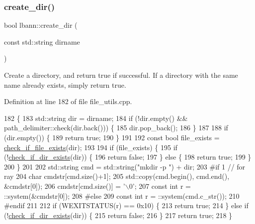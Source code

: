 \subsubsection{\texorpdfstring{create\+\_\+dir()}{create\_dir()}}
{\footnotesize\ttfamily bool lbann\+::create\+\_\+dir (\begin{DoxyParamCaption}\item[{const std\+::string}]{dirname }\end{DoxyParamCaption})}

Create a directory, and return true if successful. If a directory with the same name already exists, simply return true. 

Definition at line 182 of file file\+\_\+utils.\+cpp.


\begin{DoxyCode}
182                                          \{
183   std::string dir = dirname;
184   \textcolor{keywordflow}{if} (!dir.empty() && path\_delimiter::check(dir.back())) \{
185     dir.pop\_back();
186   \}
187 
188   \textcolor{keywordflow}{if} (dir.empty()) \{
189     \textcolor{keywordflow}{return} \textcolor{keyword}{true};
190   \}
191 
192   \textcolor{keyword}{const} \textcolor{keywordtype}{bool} file\_exists = \hyperlink{namespacelbann_a4fac6c6483965395fa79d31061485f9f}{check\_if\_file\_exists}(dir);
193 
194   \textcolor{keywordflow}{if} (file\_exists) \{
195     \textcolor{keywordflow}{if} (!\hyperlink{namespacelbann_a3ee4a1fa7a82c30999de9eb626c68311}{check\_if\_dir\_exists}(dir)) \{
196       \textcolor{keywordflow}{return} \textcolor{keyword}{false};
197     \} \textcolor{keywordflow}{else} \{
198       \textcolor{keywordflow}{return} \textcolor{keyword}{true};
199     \}
200   \}
201 
202   std::string cmd = std::string(\textcolor{stringliteral}{"mkdir -p "}) + dir;
203 \textcolor{preprocessor}{#if 1 // for ray}
204   \textcolor{keywordtype}{char} cmdstr[cmd.size()+1];
205   std::copy(cmd.begin(), cmd.end(), &cmdstr[0]);
206   cmdstr[cmd.size()] = \textcolor{charliteral}{'\(\backslash\)0'};
207   \textcolor{keyword}{const} \textcolor{keywordtype}{int} r = ::system(&cmdstr[0]);
208 \textcolor{preprocessor}{#else}
209   \textcolor{keyword}{const} \textcolor{keywordtype}{int} r = ::system(cmd.c\_str());
210 \textcolor{preprocessor}{#endif}
211 
212   \textcolor{keywordflow}{if} (WEXITSTATUS(r) == 0x10) \{
213     \textcolor{keywordflow}{return} \textcolor{keyword}{true};
214   \} \textcolor{keywordflow}{else} \textcolor{keywordflow}{if} (!\hyperlink{namespacelbann_a3ee4a1fa7a82c30999de9eb626c68311}{check\_if\_dir\_exists}(dir)) \{
215     \textcolor{keywordflow}{return} \textcolor{keyword}{false};
216   \}
217   \textcolor{keywordflow}{return} \textcolor{keyword}{true};
218 \}
\end{DoxyCode}
